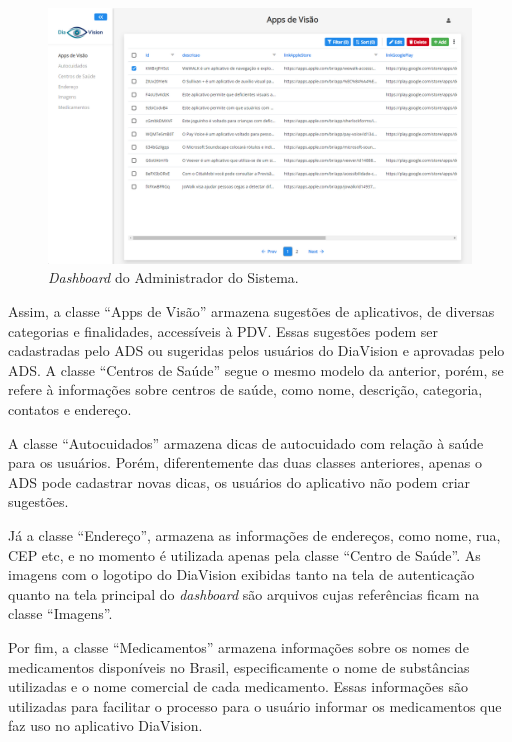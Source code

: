 \begin{figure}[htb]
    \caption{\label{fig_back_dash_apps}\emph{Dashboard} do Administrador do Sistema.}
    \begin{center}
        \includegraphics[scale=0.39]{Imagens/desenvolvimento/apps_visao_admin.png}
    \end{center}
\end{figure}

Assim, a classe ``Apps de Visão'' armazena sugestões de aplicativos, de diversas categorias e finalidades, accessíveis
à PDV. Essas sugestões podem ser cadastradas pelo ADS ou sugeridas pelos usuários do DiaVision e aprovadas pelo ADS. A
classe ``Centros de Saúde'' segue o mesmo modelo da anterior, porém, se refere à informações sobre centros de saúde, como
nome, descrição, categoria, contatos e endereço.

A classe ``Autocuidados'' armazena dicas de autocuidado com relação à saúde para os usuários. Porém, diferentemente das duas
classes anteriores, apenas o ADS pode cadastrar novas dicas, os usuários do aplicativo não podem criar sugestões.

Já a classe ``Endereço'', armazena as informações de endereços, como nome, rua, CEP etc, e no momento é utilizada apenas
pela classe ``Centro de Saúde''. As imagens com o logotipo do DiaVision exibidas tanto na tela de autenticação quanto na
tela principal do \emph{dashboard} são arquivos cujas referências ficam na classe ``Imagens''.

Por fim, a classe ``Medicamentos'' armazena informações sobre os nomes de medicamentos disponíveis no Brasil, especificamente
o nome de substâncias utilizadas e o nome comercial de cada medicamento. Essas informações são utilizadas para facilitar
o processo para o usuário informar os medicamentos que faz uso no aplicativo DiaVision.

